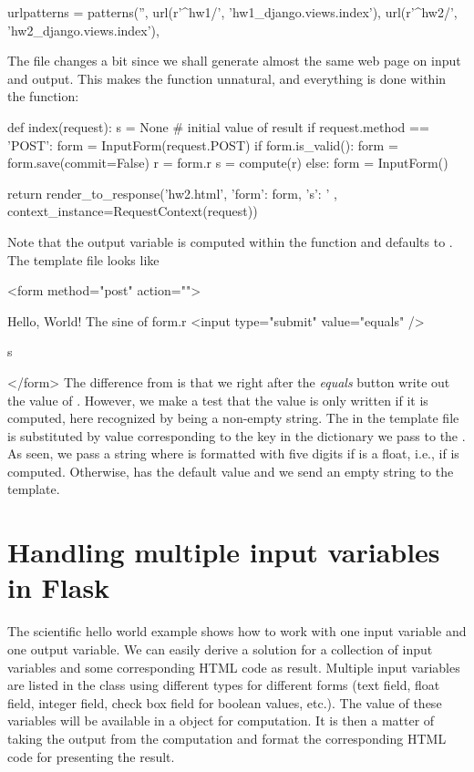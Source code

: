 \documentclass[%
oneside,                 %
final,                   %
10pt]{article}
\begin{document}
{{{{{\bpycod
urlpatterns = patterns('',
    url(r'^hw1/', 'hw1_django.views.index'),
    url(r'^hw2/', 'hw2_django.views.index'),
\epycod

The  file changes a bit since we shall generate almost the same
web page on input and output. This makes the  function
unnatural, and everything is done within the  function:

\bpycod
def index(request):
    s = None  # initial value of result
    if request.method == 'POST':
        form = InputForm(request.POST)
        if form.is_valid():
            form = form.save(commit=False)
            r = form.r
            s = compute(r)
    else:
        form = InputForm()

    return render_to_response('hw2.html',
            {'form': form,
             's': '%
             }, context_instance=RequestContext(request))
\epycod

Note that the output variable  is computed within the 
function and defaults to . The template file 
looks like

\bhtmlpro
<form method="post" action="">{%
    Hello, World! The sine of {{ form.r }}
    <input type="submit" value="equals" />
{%
{{ s }}
{%
</form>
\ehtmlpro
The difference from  is that we right after the \emph{equals}
button write out the value of . However, we make a test that
the value is only written if it is computed, here recognized by
being a non-empty string. The  in the template file
is substituted by value corresponding to the key  in the
dictionary we pass to the . As seen,
we pass a string where  is formatted with five digits if 
is a float, i.e., if  is computed. Otherwise,  has the
default value  and we send an empty string to the template.


\section{Handling multiple input variables in Flask}
\label{wf:vib:flask}

The scientific hello world example shows how to work with one input
variable and one output variable. We can easily derive a solution for
a collection of input variables and some corresponding HTML code
as result. Multiple input variables are listed in the 
class using different types for different forms (text field,
float field, integer field, check box field for boolean values, etc.).
The value of these variables will be available in a  object
for computation. It is then a matter of taking the output from the
computation and format the corresponding HTML code for presenting
the result.

}}}}}}}}
\end{document}
